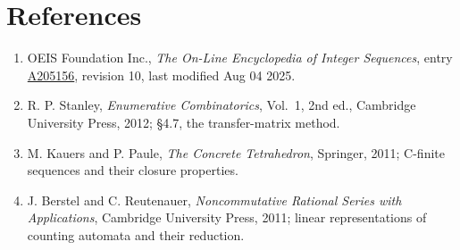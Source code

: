 \documentclass[11pt]{article}
\theoremstyle{definition}
\begin{document}
\section{References}

\begin{enumerate}

\item OEIS Foundation Inc., \emph{The On-Line Encyclopedia of Integer Sequences}, entry \href{https://oeis.org/A205156}{A205156}, revision 10, last modified Aug 04 2025.

\item R. P. Stanley, \emph{Enumerative Combinatorics}, Vol.~1, 2nd ed., Cambridge University Press, 2012; \S4.7, the transfer-matrix method.

\item M. Kauers and P. Paule, \emph{The Concrete Tetrahedron}, Springer, 2011; C-finite sequences and their closure properties.

\item J. Berstel and C. Reutenauer, \emph{Noncommutative Rational Series with Applications}, Cambridge University Press, 2011; linear representations of counting automata and their reduction.

\end{enumerate}
\end{document}
